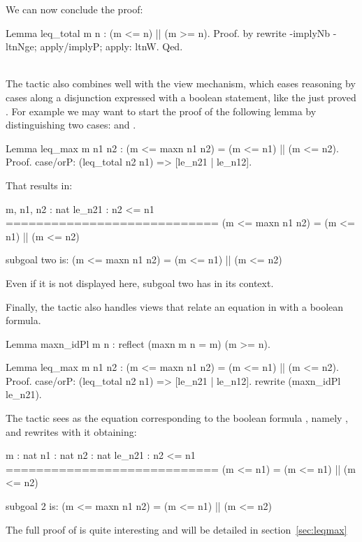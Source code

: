 We can now conclude the proof:

\begin{coq}{}{}
Lemma leq_total m n : (m <= n) || (m >= n).
Proof. by rewrite -implyNb -ltnNge; apply/implyP; apply: ltnW. Qed.
\end{coq}
\\

The  tactic also combines well with the view mechanism, which
eases reasoning by cases along a disjunction expressed with a boolean
statement, like the just proved .  For example we
may want to start the proof of the following lemma by distinguishing
two cases:  and .

\begin{coq}{}{}
Lemma leq_max m n1 n2 :
  (m <= maxn n1 n2) = (m <= n1) || (m <= n2).
Proof.
case/orP: (leq_total n2 n1) => [le_n21 | le_n12].
\end{coq}
That results in:

\begin{coqout}{}{}
m, n1, n2 : nat
le_n21 : n2 <= n1
============================
(m <= maxn n1 n2) = (m <= n1) || (m <= n2)

subgoal two is:
 (m <= maxn n1 n2) = (m <= n1) || (m <= n2)
\end{coqout}
Even if it is not displayed here, subgoal two has 
in its context.

Finally, the  tactic also handles views that relate an
equation in  with a boolean formula.

\begin{coq}{}{}
Lemma maxn_idPl {m n} : reflect (maxn m n = m) (m >= n).

Lemma leq_max m n1 n2 :
  (m <= maxn n1 n2) = (m <= n1) || (m <= n2).
Proof.
case/orP: (leq_total n2 n1) => [le_n21 | le_n12].
  rewrite (maxn_idPl le_n21).
\end{coq}
The tactic sees  as the equation corresponding
to the boolean formula , namely ,
and rewrites with it obtaining:

\begin{coqout}{}{}

  m : nat
  n1 : nat
  n2 : nat
  le_n21 : n2 <= n1
  ============================
   (m <= n1) = (m <= n1) || (m <= n2)

subgoal 2 is:
 (m <= maxn n1 n2) = (m <= n1) || (m <= n2)
\end{coqout}

The full proof of  is quite interesting and will be
detailed in section~\ref{sec:leqmax}

